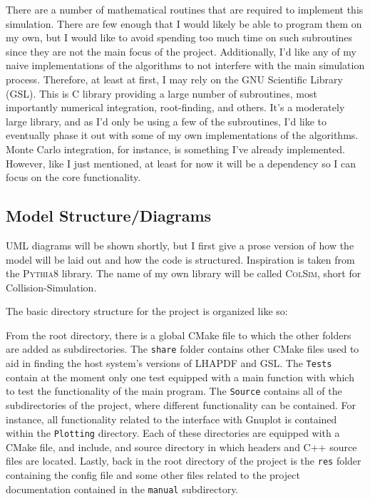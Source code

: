 There are a number of mathematical routines that are required to implement this simulation. There are few enough that I would likely be able to program them on my own, but I would like to avoid spending too much time on such subroutines since they are not the main focus of the project. Additionally, I'd like any of my naive implementations of the algorithms to not interfere with the main simulation process. Therefore, at least at first, I may rely on the GNU Scientific Library (GSL). This is C library providing a large number of subroutines, most importantly numerical integration, root-finding, and others. It's a moderately large library, and as I'd only be using a few of the subroutines, I'd like to eventually phase it out with some of my own implementations of the algorithms. Monte Carlo integration, for instance, is something I've already implemented. However, like I just mentioned, at least for now it will be a dependency so I can focus on the core functionality.


\subsection{Model Structure/Diagrams}

UML diagrams will be shown shortly, but I first give a prose version of how the model will be laid out and how the code is structured. Inspiration is taken from the \textsc{Pythia8} library. The name of my own library will be called \textsc{ColSim}, short for Collision-Simulation.

The basic directory structure for the project is organized like so:


From the root directory, there is a global CMake file to which the other folders are added as subdirectories. The \texttt{share} folder contains other CMake files used to aid in finding the host system's versions of LHAPDF and GSL. The \texttt{Tests} contain at the moment only one test equipped with a main function with which to test the functionality of the main program. The \texttt{Source} contains all of the subdirectories of the project, where different functionality can be contained. For instance, all functionality related to the interface with Gnuplot is contained within the \texttt{Plotting} directory. Each of these directories are equipped with a CMake file, and include, and source directory in which headers and C++ source files are located. Lastly, back in the root directory of the project is the \texttt{res} folder containing the config file and some other files related to the project documentation contained in the \texttt{manual} subdirectory.

